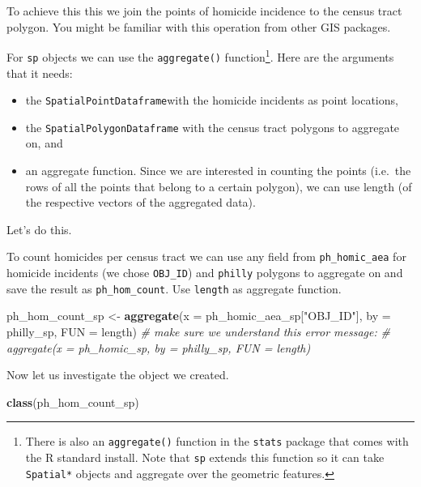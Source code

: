 \documentclass[]{book}
\newenvironment{Shaded}{\begin{snugshade}}{\end{snugshade}}
\newcommand{\KeywordTok}[1]{\textcolor[rgb]{0.13,0.29,0.53}{\textbf{#1}}}
\newcommand{\DataTypeTok}[1]{\textcolor[rgb]{0.13,0.29,0.53}{#1}}
\newcommand{\StringTok}[1]{\textcolor[rgb]{0.31,0.60,0.02}{#1}}
\newcommand{\CommentTok}[1]{\textcolor[rgb]{0.56,0.35,0.01}{\textit{#1}}}
\newcommand{\NormalTok}[1]{#1}
\providecommand{\tightlist}{%
  \setlength{\itemsep}{0pt}\setlength{\parskip}{0pt}}
\let\rmarkdownfootnote\footnote%
\def\footnote{\protect\rmarkdownfootnote}
\theoremstyle{definition}
\theoremstyle{definition}
\theoremstyle{definition}
\theoremstyle{remark}
\begin{document}
To achieve this this we join the points of homicide incidence to the
census tract polygon. You might be familiar with this operation from
other GIS packages.

For \texttt{sp} objects we can use the \texttt{aggregate()}
function\footnote{There is also an \texttt{aggregate()} function in the
  \texttt{stats} package that comes with the R standard install. Note
  that \texttt{sp} extends this function so it can take
  \texttt{Spatial*} objects and aggregate over the geometric features.}.
Here are the arguments that it needs:

\begin{itemize}
\tightlist
\item
  the \texttt{SpatialPointDataframe}with the homicide incidents as point
  locations,
\item
  the \texttt{SpatialPolygonDataframe} with the census tract polygons to
  aggregate on, and
\item
  an aggregate function. Since we are interested in counting the points
  (i.e.~the rows of all the points that belong to a certain polygon), we
  can use length (of the respective vectors of the aggregated data).
\end{itemize}

Let's do this.

To count homicides per census tract we can use any field from
\texttt{ph\_homic\_aea} for homicide incidents (we chose
\texttt{OBJ\_ID}) and \texttt{philly} polygons to aggregate on and save
the result as \texttt{ph\_hom\_count}. Use \texttt{length} as aggregate
function.

\begin{Shaded}
\begin{Highlighting}[]
\NormalTok{ph_hom_count_sp <-}\StringTok{ }\KeywordTok{aggregate}\NormalTok{(}\DataTypeTok{x =}\NormalTok{ ph_homic_aea_sp[}\StringTok{"OBJ_ID"}\NormalTok{], }\DataTypeTok{by =}\NormalTok{ philly_sp, }\DataTypeTok{FUN =}\NormalTok{ length)}
\CommentTok{# make sure we understand this error message:}
\CommentTok{# aggregate(x = ph_homic_sp, by = philly_sp, FUN = length) }
\end{Highlighting}
\end{Shaded}

Now let us investigate the object we created.

\begin{Shaded}
\begin{Highlighting}[]
\KeywordTok{class}\NormalTok{(ph_hom_count_sp)}
\end{Highlighting}
\end{Shaded}
\end{document}
